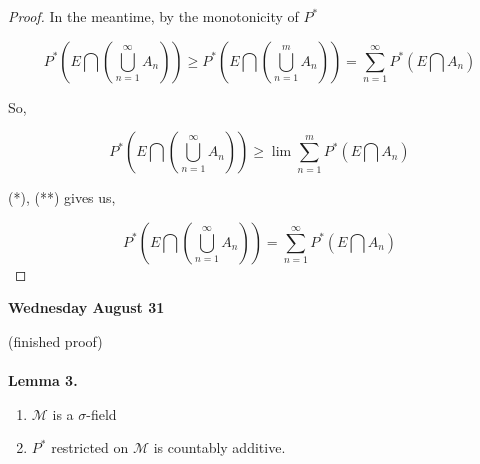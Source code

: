 \documentclass[11pt,fleqn]{book} %
\begin{document}
\begin{proof}
In the meantime, by the monotonicity of $P^*$

$$P^*(E \bigcap (\bigcup_{n=1}^\infty A_n)) \geq P^*(E \bigcap (\bigcup_{n=1}^m A_n)) =  \displaystyle \sum_{n=1}^{\infty} P^*(E \bigcap A_n)$$

So, 

$$P^*(E \bigcap (\bigcup_{n=1}^\infty A_n)) \geq \lim  \displaystyle \sum_{n=1}^{m} P^*(E \bigcap A_n)$$


(*), (**) gives us, 

$$P^*(E \bigcap (\bigcup_{n=1}^\infty A_n)) = \displaystyle \sum_{n=1}^{\infty} P^*(E \bigcap A_n)  $$

\end{proof}

\textbf{Wednesday August 31}

(finished proof)\\
\\

\textbf{Lemma 3.}
	
	\begin{enumerate}
		\item $\mathcal{M}$ is a $\sigma$-field
		\item $P^*$ restricted on $\mathcal{M}$ is countably additive. 
	\end{enumerate}
\end{document}
